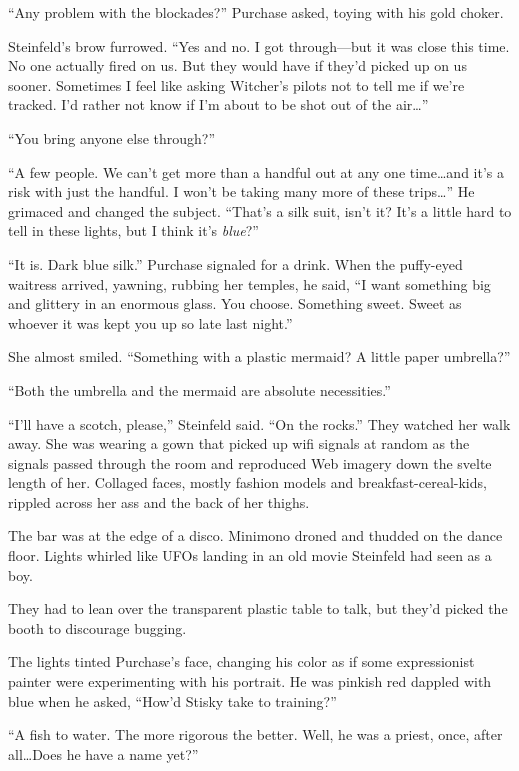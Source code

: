 ``Any problem with the blockades?'' Purchase asked, toying with his gold choker.

Steinfeld's brow furrowed. ``Yes and no. I got through---but it was close this time. No one actually fired on us. But they would have if they'd picked up on us sooner. Sometimes I feel like asking Witcher's pilots not to tell me if we're tracked. I'd rather not know if I'm about to be shot out of the air\ldots ''

``You bring anyone else through?''

``A few people. We can't get more than a handful out at any one time\ldots and it's a risk with just the handful. I won't be taking many more of these trips\ldots '' He grimaced and changed the subject. ``That's a silk suit, isn't it? It's a little hard to tell in these lights, but I think it's \textit{blue}?''

``It is. Dark blue silk.'' Purchase signaled for a drink. When the puffy-eyed waitress arrived, yawning, rubbing her temples, he said, ``I want something big and glittery in an enormous glass. You choose. Something sweet. Sweet as whoever it was kept you up so late last night.''

She almost smiled. ``Something with a plastic mermaid? A little paper umbrella?''

``Both the umbrella and the mermaid are absolute necessities.''

``I'll have a scotch, please,'' Steinfeld said. ``On the rocks.'' They watched her walk away. She was wearing a gown that picked up wifi signals at random as the signals passed through the room and reproduced Web imagery down the svelte length of her. Collaged faces, mostly fashion models and breakfast-cereal-kids, rippled across her ass and the back of her thighs.

The bar was at the edge of a disco. Minimono droned and thudded on the dance floor. Lights whirled like UFOs landing in an old movie Steinfeld had seen as a boy.

They had to lean over the transparent plastic table to talk, but they'd picked the booth to discourage bugging.

The lights tinted Purchase's face, changing his color as if some expressionist painter were experimenting with his portrait. He was pinkish red dappled with blue when he asked, ``How'd Stisky take to training?''

``A fish to water. The more rigorous the better. Well, he was a priest, once, after all\ldots Does he have a name yet?''

